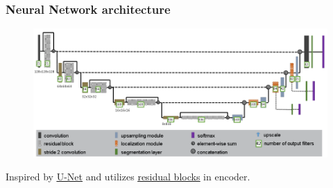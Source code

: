 \documentclass{beamer}
\begin{document}
\begin{frame}
\frametitle{Neural Network architecture}
\begin{figure}
	\centering
	\includegraphics[width=\textwidth]{images/paper_1_architecture.png}
\end{figure}
Inspired by \href{https://arxiv.org/abs/1505.04597}{{\color{blue}\underline{U-Net}}} and utilizes \href{https://arxiv.org/abs/1512.03385}{{\color{blue}\underline{residual blocks}}} in encoder.
\end{frame}
\end{document}
